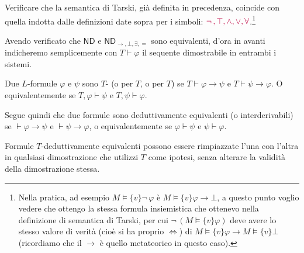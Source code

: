 \begin{exercise}
    Verificare che la semantica di Tarski, già definita in precedenza, coincide con quella indotta dalle definizioni date sopra 
    per i simboli: $\textcolor{purple}{\neg \,, \top, \land, \lor, \forall}$.\footnote{Nella pratica, ad esempio $M \models \{v\}\neg \,\varphi$ è $M \models \{v\}\varphi \to \bot$, a questo punto voglio vedere che ottengo la stessa formula insiemistica che ottenevo nella definizione di semantica di Tarski, per cui $\neg \,(M \models \{v\}\varphi)$ deve avere 
    lo stesso valore di verità (cioè si ha proprio $\iff$) di $M \models \{v\}\varphi \to M \models \{v\}\bot$ (ricordiamo che il $\to$ è quello metateorico in questo caso).}
\end{exercise}
\pagebreak
\begin{notation}[Sequenti]
    Avendo verificato che $\mathsf{ND}$ e $\mathsf{ND}_{\to, \bot, \exists, =}$ sono equivalenti, d'ora in avanti indicheremo semplicemente con $T \vdash \varphi$ il sequente dimostrabile in entrambi i sistemi.
\end{notation}

\begin{definition}
    Due $L$-formule $\varphi$ e $\psi$ sono $T$- (o  per $T$, o  per $T$) se $T \vdash \varphi \to \psi$ e $T \vdash \psi \to \varphi$. O equivalentemente se $T, \varphi \vdash \psi$ e $T, \psi \vdash \varphi$.
\end{definition}

\begin{remark}
    Segue quindi che due formule sono deduttivamente equivalenti (o interderivabili) se $\vdash \varphi \to \psi$ e $\vdash \psi \to \varphi$, o equivalentemente se $\varphi \vdash \psi$ e $\psi \vdash \varphi$.
\end{remark}

\begin{remark}
    Formule $T$-deduttivamente equivalenti possono essere rimpiazzate l'una con l'altra in qualsiasi dimostrazione che utilizzi $T$ come ipotesi, senza alterare la validità della dimostrazione stessa.
\end{remark}

